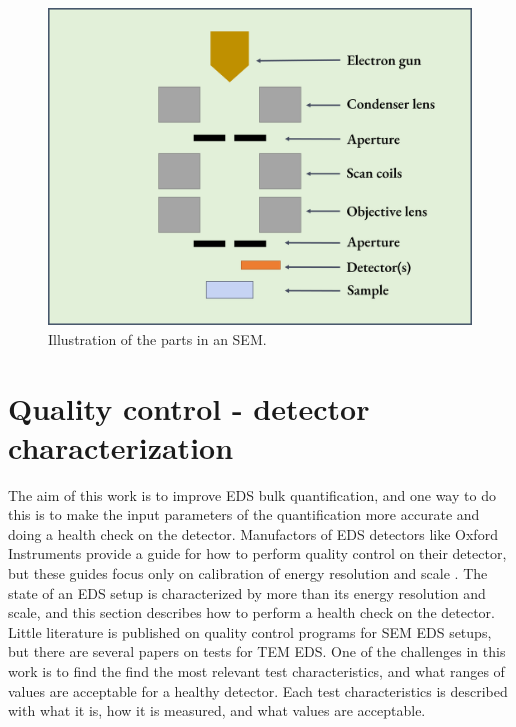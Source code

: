 \begin{figure}[ht]
    \centering
    \includegraphics[width=0.8\linewidth]{figures/SEM_setup.png}
    \caption{
        Illustration of the parts in an SEM.
    }
    \label{fig:SEM_setup}
\end{figure}






\section{Quality control - detector characterization}
\label{theory:qc}

The aim of this work is to improve EDS bulk quantification, and one way to do this is to make the input parameters of the quantification more accurate and doing a health check on the detector.
Manufactors of EDS detectors like Oxford Instruments provide a guide for how to perform quality control on their detector, but these guides focus only on calibration of energy resolution and scale \cite{aztec_manual}.
The state of an EDS setup is characterized by more than its energy resolution and scale, and this section describes how to perform a health check on the detector.
Little literature is published on quality control programs for SEM EDS setups, but there are several papers on tests for TEM EDS.
One of the challenges in this work is to find the find the most relevant test characteristics, and what ranges of values are acceptable for a healthy detector.
Each test characteristics is described with what it is, how it is measured, and what values are acceptable.



